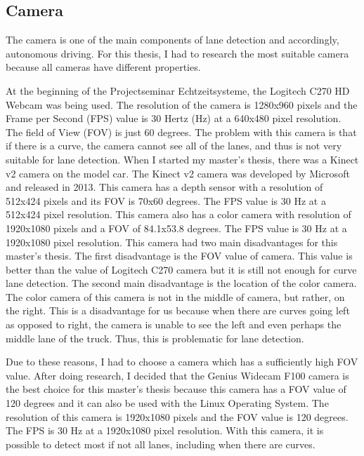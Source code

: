 \subsection{Camera}\label{sec:Camera}


The camera is one of the main components of lane detection and accordingly, autonomous driving. For this thesis, I had 
to research the most suitable camera because all cameras have different properties.

At the beginning of the Projectseminar Echtzeitsysteme, the Logitech C270 HD Webcam was being used. The resolution of 
the camera is 1280x960 pixels and the Frame per Second (FPS) value is 30 Hertz (Hz) at a 640x480 pixel resolution. 
The field of View (FOV) is just 60 degrees. The problem with this camera is that if there is a curve, the camera 
cannot see all of the lanes, and thus is not very suitable for lane detection. When I started my master's thesis, there 
was a Kinect v2 camera on the model car.  The Kinect v2 camera was developed by Microsoft and released in 2013. This 
camera has a depth sensor with a resolution of 512x424 pixels and its FOV is 70x60 degrees. The FPS value is 30 Hz at 
a 512x424 pixel resolution. This camera also has a color camera with resolution of 1920x1080 pixels and a FOV of 
84.1x53.8 degrees. The FPS value is 30 Hz at a 1920x1080 pixel resolution. This camera had two main disadvantages for 
this master's thesis. The first disadvantage is the FOV value of camera. This value is better than the value of Logitech 
C270 camera but it is still not enough for curve lane detection. The second main disadvantage is the location of the 
color camera. The color camera of this camera is not in the middle of camera, but rather, on the right. This is a 
disadvantage for us because when there are curves going left as opposed to right, the camera is unable to see the 
left and even perhaps the middle lane of the truck. Thus, this is problematic for lane detection.

Due to these reasons, I had to choose a camera which has a sufficiently high FOV value. After doing research, I decided 
that the Genius Widecam F100 camera is the best choice for this master's thesis because this camera has a FOV value of 
120 degrees and it can also be used with the Linux Operating System. The resolution of this camera is 1920x1080 pixels 
and the FOV value is 120 degrees. The FPS is 30 Hz at a 1920x1080 pixel resolution. With this camera, it is possible 
to detect most if not all lanes, including when there are curves. 



